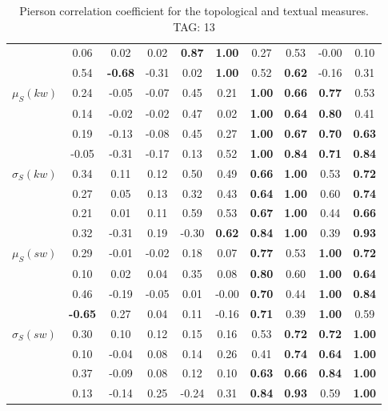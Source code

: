 \begin{table*}[h!]
\begin{center}
\begin{tabular}{| l || c | c | c | c | c | c | c | c | c |}
 & 0.06 & 0.02 & 0.02 & {\bf 0.87} & {\bf 1.00} & 0.27 & 0.53 & -0.00 & 0.10 \\
 & 0.54 & {\bf -0.68} & -0.31 & 0.02 & {\bf 1.00} & 0.52 & {\bf 0.62} & -0.16 & 0.31 \\\hline
$\mu_S(kw)$ & 0.24 & -0.05 & -0.07 & 0.45 & 0.21 & {\bf 1.00} & {\bf 0.66} & {\bf 0.77} & 0.53 \\
 & 0.14 & -0.02 & -0.02 & 0.47 & 0.02 & {\bf 1.00} & {\bf 0.64} & {\bf 0.80} & 0.41 \\
 & 0.19 & -0.13 & -0.08 & 0.45 & 0.27 & {\bf 1.00} & {\bf 0.67} & {\bf 0.70} & {\bf 0.63} \\
 & -0.05 & -0.31 & -0.17 & 0.13 & 0.52 & {\bf 1.00} & {\bf 0.84} & {\bf 0.71} & {\bf 0.84} \\\hline
$\sigma_S(kw)$ & 0.34 & 0.11 & 0.12 & 0.50 & 0.49 & {\bf 0.66} & {\bf 1.00} & 0.53 & {\bf 0.72} \\
 & 0.27 & 0.05 & 0.13 & 0.32 & 0.43 & {\bf 0.64} & {\bf 1.00} & 0.60 & {\bf 0.74} \\
 & 0.21 & 0.01 & 0.11 & 0.59 & 0.53 & {\bf 0.67} & {\bf 1.00} & 0.44 & {\bf 0.66} \\
 & 0.32 & -0.31 & 0.19 & -0.30 & {\bf 0.62} & {\bf 0.84} & {\bf 1.00} & 0.39 & {\bf 0.93} \\\hline
$\mu_S(sw)$ & 0.29 & -0.01 & -0.02 & 0.18 & 0.07 & {\bf 0.77} & 0.53 & {\bf 1.00} & {\bf 0.72} \\
 & 0.10 & 0.02 & 0.04 & 0.35 & 0.08 & {\bf 0.80} & 0.60 & {\bf 1.00} & {\bf 0.64} \\
 & 0.46 & -0.19 & -0.05 & 0.01 & -0.00 & {\bf 0.70} & 0.44 & {\bf 1.00} & {\bf 0.84} \\
 & {\bf -0.65} & 0.27 & 0.04 & 0.11 & -0.16 & {\bf 0.71} & 0.39 & {\bf 1.00} & 0.59 \\\hline
$\sigma_S(sw)$ & 0.30 & 0.10 & 0.12 & 0.15 & 0.16 & 0.53 & {\bf 0.72} & {\bf 0.72} & {\bf 1.00} \\
 & 0.10 & -0.04 & 0.08 & 0.14 & 0.26 & 0.41 & {\bf 0.74} & {\bf 0.64} & {\bf 1.00} \\
 & 0.37 & -0.09 & 0.08 & 0.12 & 0.10 & {\bf 0.63} & {\bf 0.66} & {\bf 0.84} & {\bf 1.00} \\
 & 0.13 & -0.14 & 0.25 & -0.24 & 0.31 & {\bf 0.84} & {\bf 0.93} & 0.59 & {\bf 1.00} \\\hline
\end{tabular}
\caption{Pierson correlation coefficient for the topological and textual measures. TAG: 13}
\end{center}
\end{table*}